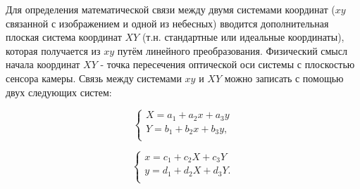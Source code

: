 \documentclass[12pt,a4paper]{article}
\begin{document}
Для определения математической связи между двумя системами координат ($xy$ связанной с изображением и одной из небесных) вводится дополнительная плоская система координат $XY$ (т.н. стандартные или идеальные координаты), которая получается из $xy$ путём линейного преобразования. Физический смысл начала координат $XY$ - точка пересечения оптической оси системы с плоскостью сенсора камеры. Связь между системами $xy$ и $XY$ можно записать с помощью двух следующих систем:

\begin{equation}\label{eq:eq1}
\begin{cases}
X = a_1 + a_2 x +a_3 y\\
Y = b_1 + b_2 x +b_3 y,\\
\end{cases}
\end{equation}

\begin{equation}\label{eq:eq2}
\begin{cases}
x = c_1 + c_2 X +c_3 Y\\
y = d_1 + d_2 X +d_3 Y.\\
\end{cases}
\end{equation}
\end{document}
